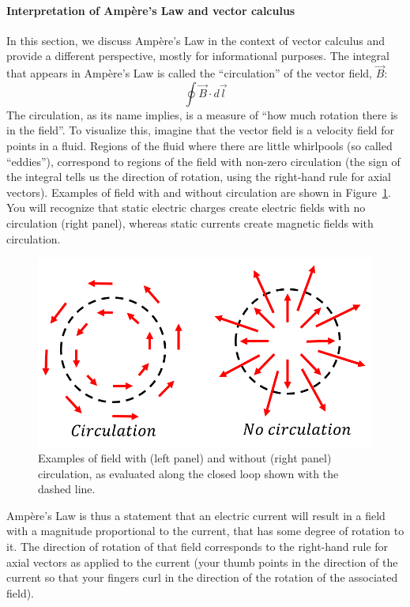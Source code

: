 \paragraph{Interpretation of Ampère's Law and vector calculus}\label{sec:magneticsource:interpretation}

In this section, we discuss Ampère's Law in the context of vector calculus and provide a different perspective, mostly for informational purposes. The integral that appears in Ampère's Law is called the ``circulation'' of the vector field, $\vec B$:
\begin{equation}
\oint \vec B \cdot d\vec l
\end{equation}
The circulation, as its name implies, is a measure of ``how much rotation there is in the field''. To visualize this, imagine that the vector field is a velocity field for points in a fluid. Regions of the fluid where there are little whirlpools (so called ``eddies''), correspond to regions of the field with non-zero circulation (the sign of the integral tells us the direction of rotation, using the right-hand rule for axial vectors). Examples of field with and without circulation are shown in Figure~\ref{fig:magneticsource:circulation}. You will recognize that static electric charges create electric fields with no circulation (right panel), whereas static currents create magnetic fields with circulation.

\begin{figure}[!htbp]
\centering
\includegraphics[width=0.5\linewidth]{files/circulation-e4d7d465e28a0d993fee414e2645c2bf.png}
\caption[]{Examples of field with (left panel) and without (right panel) circulation, as evaluated along the closed loop shown with the dashed line.}
\label{fig:magneticsource:circulation}
\end{figure}

Ampère's Law is thus a statement that an electric current will result in a field with a magnitude proportional to the current, that has some degree of rotation to it. The direction of rotation of that field corresponds to the right-hand rule for axial vectors as applied to the current (your thumb points in the direction of the current so that your fingers curl in the direction of the rotation of the associated field).

